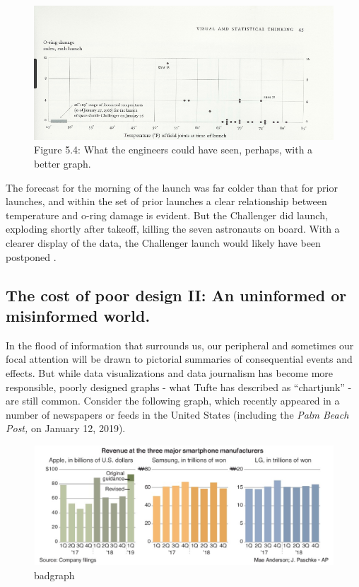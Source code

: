 \documentclass[
  openany]{book}
\begin{document}
\begin{figure}
\centering
\includegraphics{tufteChallenger.PNG}
\caption{Figure 5.4: What the engineers could have seen, perhaps, with a better graph.}
\end{figure}

The forecast for the morning of the launch was far colder than that for prior launches, and within the set of prior launches a clear relationship between temperature and o-ring damage is evident. But the Challenger did launch, exploding shortly after takeoff, killing the seven astronauts on board. With a clearer display of the data, the Challenger launch would likely have been postponed \citep[ ]{tufte2001visual}.

\hypertarget{the-cost-of-poor-design-ii-an-uninformed-or-misinformed-world.}{%
\subsection{The cost of poor design II: An uninformed or misinformed world.}\label{the-cost-of-poor-design-ii-an-uninformed-or-misinformed-world.}}

In the flood of information that surrounds us, our peripheral and sometimes our focal attention will be drawn to pictorial summaries of consequential events and effects. But while data visualizations and data journalism has become more responsible, poorly designed graphs - what Tufte has described as ``chartjunk'' - are still common. Consider the following graph, which recently appeared in a number of newspapers or feeds in the United States (including the \emph{Palm Beach Post,} on January 12, 2019).

\begin{figure}
\centering
\includegraphics{badgraph.PNG}
\caption{badgraph}
\end{figure}
\end{document}
